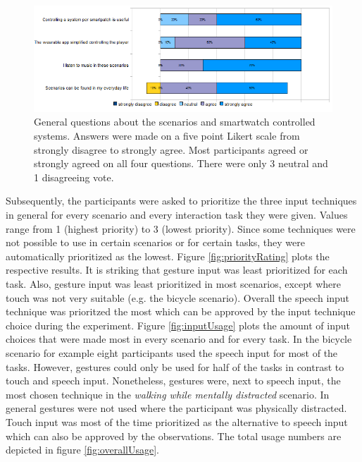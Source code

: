\begin{figure}[bth]
	\myfloatalign
	\label{fig:scenarioQuestions}
	\includegraphics[width=1.2\linewidth]{img/generalQuestionsPlot.png}
	\caption{General questions about the scenarios and smartwatch controlled systems. Answers were made on a five point Likert scale from strongly disagree to strongly agree. Most participants agreed or strongly agreed on all four questions. There were only 3 neutral and 1 disagreeing vote.}
\end{figure}

Subsequently, the participants were asked to prioritize the three input techniques in general for every scenario and every interaction task they were given. Values range from 1 (highest priority) to 3 (lowest priority). Since some techniques were not possible to use in certain scenarios or for certain tasks, they were automatically prioritized as the lowest. Figure \ref{fig:priorityRating} plots the respective results. It is striking that gesture input was least prioritized for each task. Also, gesture input was least prioritized in most scenarios, except where touch was not very suitable (e.g. the bicycle scenario). Overall the speech input technique was prioritzed the most which can be approved by the input technique choice during the experiment. Figure \ref{fig:inputUsage} plots the amount of input choices that were made most in every scenario and for every task. In the bicycle scenario for example eight participants used the speech input for most of the tasks. However, gestures could only be used for half of the tasks in contrast to touch and speech input. Nonetheless, gestures were, next to speech input, the most chosen technique in the \textit{walking while mentally distracted} scenario. In general gestures were not used where the participant was physically distracted. Touch input was most of the time prioritized as the alternative to speech input which can also be approved by the observations. The total usage numbers are depicted in figure \ref{fig:overallUsage}.

